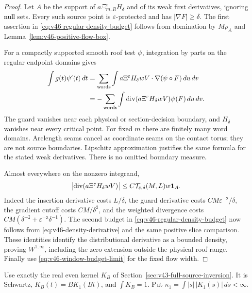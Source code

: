 \begin{proof}
Let $A$ be the support of
$a\Xi_{m,R}^{\varepsilon}H_\delta$ and of its weak first derivatives,
ignoring null sets. Every such source point is
$\varepsilon$-protected and has $|\nabla F|\ge\delta$.
The first assertion in \eqref{eq:v46-regular-density-budget} follows
from domination by $M\rho_A$ and
Lemma~\ref{lem:v46-positive-flow-box}.

For a compactly supported smooth roof test $\psi$, integration by
parts on the regular endpoint domains gives
\begin{align}
 \int g(t)\psi'(t)\,dt
  &=\sum_{\rm words}\int a\Xi^{\varepsilon}H_\delta w
                                  V\cdot\nabla(\psi\circ F)\,du\,dv\notag\\
  &=-\sum_{\rm words}\int
      \operatorname{div}(a\Xi^{\varepsilon}H_\delta wV)
                                            \psi(F)\,du\,dv.
                                      \label{eq:v46-density-derivative}
\end{align}
The guard vanishes near each physical or section-decision boundary,
and $H_\delta$ vanishes near every critical point. For fixed $m$ there
are finitely many word domains. Arclength seams cancel as coordinate
seams on the contact torus; they are not source boundaries.
Lipschitz approximation justifies the same formula for the stated
weak derivatives. There is no omitted boundary measure.

Almost everywhere on the nonzero integrand,
\[
 \bigl|\operatorname{div}(a\Xi^{\varepsilon}H_\delta wV)\bigr|
       \le C\mathcal T_{\varepsilon,\delta}(M,L)w\mathbf1_A.
\]
Indeed the insertion derivative costs $L/\delta$, the guard derivative
costs $CM\varepsilon^{-2}/\delta$, the gradient cutoff costs
$CM/\delta^2$, and the weighted divergence costs
$CM(\delta^{-2}+\varepsilon^{-3}\delta^{-1})$.
The second budget in \eqref{eq:v46-regular-density-budget} now follows
from \eqref{eq:v46-density-derivative} and the same positive slice
comparison. These identities identify the distributional derivative
as a bounded density, proving $W^{1,\infty}$, including the zero
extension outside the physical roof range. Finally use
\eqref{eq:v46-window-budget-limit} for the fixed flow width.
\end{proof}

Use exactly the real even kernel $K_B$ of
Section~\ref{sec:v43-full-source-inversion}. It is Schwartz,
$K_B(t)=BK_1(Bt)$, and $\int K_B=1$. Put
$\kappa_1=\int |s|\,|K_1(s)|\,ds<\infty$.

